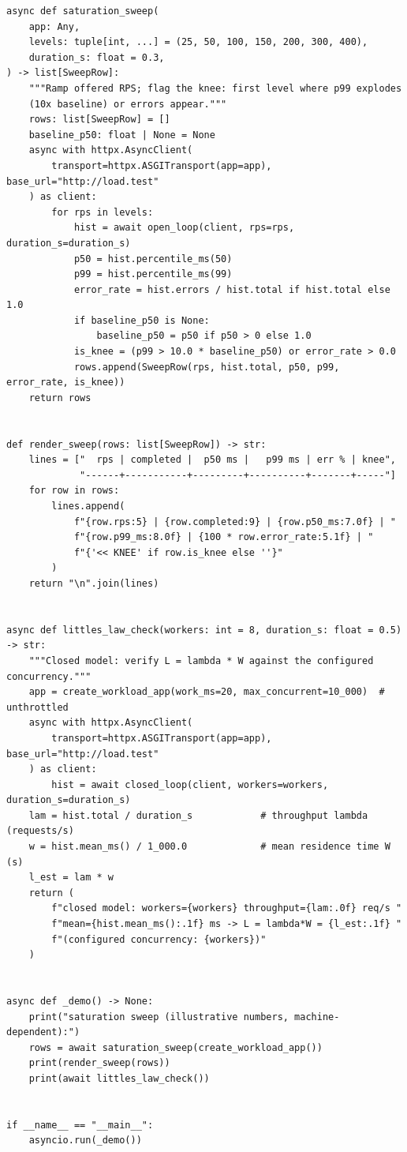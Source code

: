 \begin{verbatim}
async def saturation_sweep(
    app: Any,
    levels: tuple[int, ...] = (25, 50, 100, 150, 200, 300, 400),
    duration_s: float = 0.3,
) -> list[SweepRow]:
    """Ramp offered RPS; flag the knee: first level where p99 explodes
    (10x baseline) or errors appear."""
    rows: list[SweepRow] = []
    baseline_p50: float | None = None
    async with httpx.AsyncClient(
        transport=httpx.ASGITransport(app=app), base_url="http://load.test"
    ) as client:
        for rps in levels:
            hist = await open_loop(client, rps=rps, duration_s=duration_s)
            p50 = hist.percentile_ms(50)
            p99 = hist.percentile_ms(99)
            error_rate = hist.errors / hist.total if hist.total else 1.0
            if baseline_p50 is None:
                baseline_p50 = p50 if p50 > 0 else 1.0
            is_knee = (p99 > 10.0 * baseline_p50) or error_rate > 0.0
            rows.append(SweepRow(rps, hist.total, p50, p99, error_rate, is_knee))
    return rows


def render_sweep(rows: list[SweepRow]) -> str:
    lines = ["  rps | completed |  p50 ms |   p99 ms | err % | knee",
             "------+-----------+---------+----------+-------+-----"]
    for row in rows:
        lines.append(
            f"{row.rps:5} | {row.completed:9} | {row.p50_ms:7.0f} | "
            f"{row.p99_ms:8.0f} | {100 * row.error_rate:5.1f} | "
            f"{'<< KNEE' if row.is_knee else ''}"
        )
    return "\n".join(lines)


async def littles_law_check(workers: int = 8, duration_s: float = 0.5) -> str:
    """Closed model: verify L = lambda * W against the configured concurrency."""
    app = create_workload_app(work_ms=20, max_concurrent=10_000)  # unthrottled
    async with httpx.AsyncClient(
        transport=httpx.ASGITransport(app=app), base_url="http://load.test"
    ) as client:
        hist = await closed_loop(client, workers=workers, duration_s=duration_s)
    lam = hist.total / duration_s            # throughput lambda (requests/s)
    w = hist.mean_ms() / 1_000.0             # mean residence time W (s)
    l_est = lam * w
    return (
        f"closed model: workers={workers} throughput={lam:.0f} req/s "
        f"mean={hist.mean_ms():.1f} ms -> L = lambda*W = {l_est:.1f} "
        f"(configured concurrency: {workers})"
    )


async def _demo() -> None:
    print("saturation sweep (illustrative numbers, machine-dependent):")
    rows = await saturation_sweep(create_workload_app())
    print(render_sweep(rows))
    print(await littles_law_check())


if __name__ == "__main__":
    asyncio.run(_demo())
\end{verbatim}

